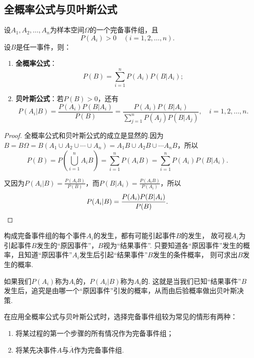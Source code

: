 \subsection{全概率公式与贝叶斯公式}
\begin{theorem}
设\(A_1,A_2,\dotsc,A_n\)为样本空间\(\Omega\)的一个完备事件组，且\[
P(A_i) > 0 \quad(i=1,2,\dotsc,n).
\]设\(B\)是任一事件，则：
\begin{enumerate}
\item {\bf 全概率公式}：\begin{equation}
P(B) = \sum\limits_{i=1}^n P(A_i) P(B \vert A_i);
\end{equation}
\item {\bf 贝叶斯公式}：若\(P(B) > 0\)，还有\begin{equation}
P(A_i \vert B) = \frac{P(A_i) P(B \vert A_i)}{P(B)}
= \frac{P(A_i) P(B \vert A_i)}{\sum\limits_{j=1}^n P(A_j) P(B \vert A_j)},
\quad i = 1,2,\dotsc,n.
\end{equation}
\end{enumerate}
\begin{proof}
全概率公式和贝叶斯公式的成立是显然的.因为\(B = B \Omega = B(A_1 \cup A_2 \cup \dotsb \cup A_n) = A_1 B \cup A_2 B \cup \dotsb A_n B\)，所以\[
P(B) = P\left(\bigcup\limits_{i=1}^n A_i B\right)
= \sum\limits_{i=1}^n P(A_i B)
= \sum\limits_{i=1}^n P(A_i) P(B \vert A_i).
\]

又因为\(P(A_i \vert B) = \frac{P(A_i B)}{P(B)}\)，而\(P(B \vert A_i) = \frac{P(A_i B)}{P(A_i)}\)，所以\[
P(A_i \vert B) = \frac{P(A_i) P(B \vert A_i)}{P(B)}.
\qedhere
\]
\end{proof}
\end{theorem}

构成完备事件组的每个事件\(A_i\)的发生，都有可能引起事件\(B\)的发生，
故可视\(A_i\)为引起事件\(B\)发生的“原因事件”，\(B\)视为“结果事件”.
只要知道各“原因事件”发生的概率，且知道“原因事件”\(A_i\)发生后引起“结果事件”\(B\)发生的条件概率，
则可求出\(B\)发生的概率.

如果我们\(P(A_i)\)称为\(A_i\)的，\(P(A_i \vert B)\)称为\(A_i\)的.
这就是当我们已知“结果事件”\(B\)发生后，追究是由哪一个“原因事件”引发的概率，从而由后验概率做出贝叶斯决策.

在应用全概率公式与贝叶斯公式时，选择完备事件组较为常见的情形有两种：
\begin{enumerate}
\item 将某过程的第一个步骤的所有情况作为完备事件组；
\item 将某先决事件\(A\)与\(\overline{A}\)作为完备事件组.
\end{enumerate}

